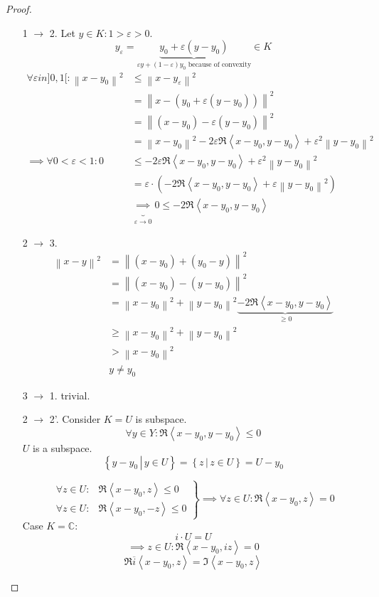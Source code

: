 \documentclass{article}
\newcommand{\setdef}[2]{\left\{\left.#1\,\right|\,#2\right\}}
\newcommand{\ip}[2]{\left\langle#1,#2\right\rangle} %
\newcommand{\norm}[1]{\left\|#1\right\|}
\begin{document}
\begin{proof}
  \begin{enumerate}
    \item[1 $\to$ 2.]
      Let $y \in K: 1 > \varepsilon > 0$.
      \[ y_\varepsilon = \underbrace{y_0 + \varepsilon(y - y_0)}_{\varepsilon y + (1 - \varepsilon) y_0 \text{ because of convexity}} \in K \]
      \begin{align*}
        \forall \varepsilon in ]0,1[: \norm{x - y_0}^2
          &\leq \norm{x - y_{\varepsilon}}^2 \\
          &= \norm{x - (y_0 + \varepsilon (y - y_0))}^2 \\
          &= \norm{(x - y_0) - \varepsilon(y - y_0)}^2 \\
          &= \norm{x - y_0}^2 - 2\varepsilon\Re\ip{x - y_0}{y - y_0} + \varepsilon^2 \norm{y - y_0}^2 \\
       \implies \forall 0 < \varepsilon < 1: 0
          &\leq -2\varepsilon \Re\ip{x - y_0}{y - y_0} + \varepsilon^2 \norm{y - y_0}^2 \\
          &= \varepsilon \cdot \left(- 2\Re\ip{x - y_0}{y - y_0} + \varepsilon \norm{y - y_0}^2\right) \\
          &\underbrace{\implies}_{\varepsilon \to 0} 0 \leq - 2\Re\ip{x - y_0}{y - y_0}
      \end{align*}
    \item[2 $\to$ 3.]
      \begin{align*}
        \norm{x - y}^2 &= \norm{(x - y_0) + (y_0 - y)}^2 \\
          &= \norm{(x - y_0) - (y - y_0)}^2 \\
          &= \norm{x - y_0}^2 + \norm{y - y_0}^2 \underbrace{- 2\Re\ip{x - y_0}{y - y_0}}_{\geq 0} \\
          &\geq \norm{x - y_0}^2 + \norm{y - y_0}^2 \\
          &> \norm{x - y_0}^2 \\
          & y \neq y_0
      \end{align*}
    \item[3 $\to$ 1.]
      trivial.
    \item[2 $\to$ 2'.]
      Consider $K = U$ is subspace.
      \[ \forall y \in Y: \Re\ip{x - y_0}{y - y_0} \leq 0 \]
      $U$ is a subspace.
      \[ \setdef{y - y_0}{y \in U} = \setdef{z}{z \in U} = U - y_0 \]

      \[
        \left.
        \begin{array}{ll}
          \forall z \in U: &\Re\ip{x - y_0}{z} \leq 0 \\
          \forall z \in U: &\Re\ip{x - y_0}{-z} \leq 0
        \end{array}
        \right\}
        \implies \forall z \in U: \Re\ip{x - y_0}{z} = 0
      \]
      Case $K = \mathbb C$:
      \[ i \cdot U = U \]
      \[ \implies z \in U: \Re\ip{x - y_0}{iz} = 0 \]
      \[ \Re\overline{i}\ip{x - y_0}{z} = \Im\ip{x - y_0}{z} \]
  \end{enumerate}
\end{proof}
\end{document}
